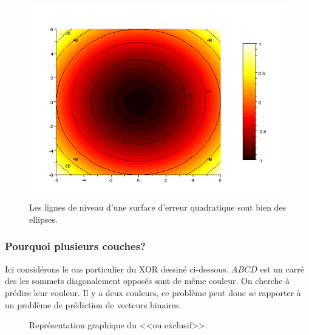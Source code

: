 \documentclass{article}
\theoremstyle{definition}
\begin{document}
\begin{figure}[!h]\centering
\includegraphics[scale=0.5]{level.png}
\caption{Les lignes de niveau d'une surface d'erreur quadratique sont bien des ellipses. }
\label{fig:level}
\end{figure}

\newpage


\subsubsection{Pourquoi plusieurs couches?}

\noindent Ici considérons le cas particulier du XOR dessiné ci-dessous. $ABCD$ est un carré des les sommets diagonalement opposés sont de même couleur. On cherche à prédire leur couleur. Il y a deux couleurs, ce problème peut donc se rapporter à un problème de prédiction de vecteurs binaires.

\begin{figure}[h!]
\begin{center}
\end{center}
\label{XOR}
\caption{Représentation graphique du <<ou exclusif>>.}
\end{figure}
\end{document}
